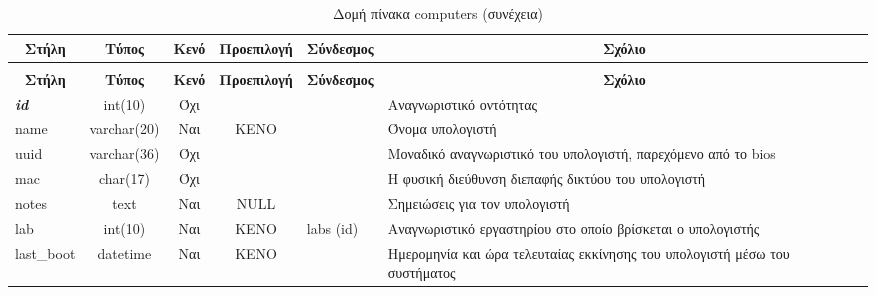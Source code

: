 %
%
\begin{longtable}{|l|c|c|c|l|p{4.5cm}|}
	\caption{Δομή πίνακα computers} \label{tab:computers-structure} \\
	\hline \multicolumn{1}{|c|}{\textbf{Στήλη}} & \multicolumn{1}{|c|}{\textbf{Τύπος}} & \multicolumn{1}{|c|}{\textbf{Κενό}} & \multicolumn{1}{|c|}{\textbf{Προεπιλογή}} & \multicolumn{1}{|c|}{\textbf{Σύνδεσμος}} & \multicolumn{1}{|c|}{\textbf{Σχόλιο}} \\ \hline \hline \endfirsthead
	\caption[{}]{Δομή πίνακα computers (συνέχεια)} \\
	\hline \multicolumn{1}{|c|}{\textbf{Στήλη}} & \multicolumn{1}{|c|}{\textbf{Τύπος}} & \multicolumn{1}{|c|}{\textbf{Κενό}} & \multicolumn{1}{|c|}{\textbf{Προεπιλογή}} & \multicolumn{1}{|c|}{\textbf{Σύνδεσμος}} & \multicolumn{1}{|c|}{\textbf{Σχόλιο}} \\ \hline \hline \endhead \endfoot
	\textbf{\textit{id}} & int(10) & Όχι &  &  & Αναγνωριστικό οντότητας \\ \hline
	name & varchar(20) & Ναι & ΚΕΝΟ &  & Όνομα υπολογιστή \\ \hline
	uuid & varchar(36) & Όχι &  &  & Μοναδικό αναγνωριστικό του υπολογιστή, παρεχόμενο από το bios \\ \hline
	mac & char(17) & Όχι &  &  & Η φυσική διεύθυνση διεπαφής δικτύου του υπολογιστή \\ \hline
	notes & text & Ναι & NULL &  & Σημειώσεις για τον υπολογιστή \\ \hline
	lab & int(10) & Ναι & ΚΕΝΟ & labs (id) & Αναγνωριστικό εργαστηρίου στο οποίο βρίσκεται ο υπολογιστής \\ \hline
	last\_boot & datetime & Ναι & ΚΕΝΟ &  & Ημερομηνία και ώρα τελευταίας εκκίνησης του υπολογιστή μέσω του συστήματος \\ \hline
\end{longtable}

